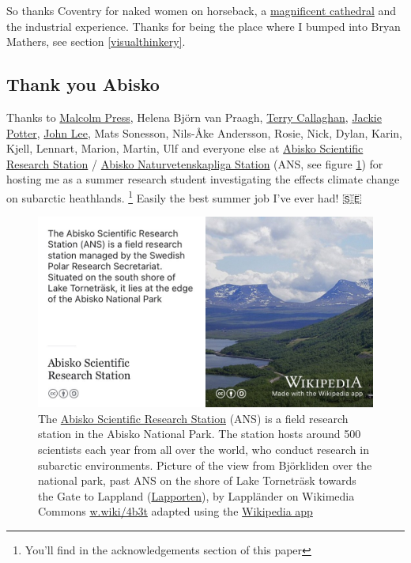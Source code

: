 \documentclass[
]{book}
\begin{document}
So thanks Coventry for naked women on horseback, a \href{https://en.wikipedia.org/wiki/Coventry_Cathedral}{magnificent cathedral} and the industrial experience. Thanks for being the place where I bumped into Bryan Mathers, see section \ref{visualthinkery}. 🙏

\hypertarget{abisko}{%
\subsection{Thank you Abisko}\label{abisko}}

Thanks to \href{https://en.wikipedia.org/wiki/Malcolm_Press}{Malcolm Press}, Helena Björn van Praagh, \href{https://en.wikipedia.org/wiki/Terry_Callaghan}{Terry Callaghan}, \href{https://www.brookes.ac.uk/ocsld/about-ocsld/staff-profiles/jackie-potter/}{Jackie Potter}, \href{https://www.sheffield.ac.uk/biosciences/people/academic-staff/john-lee}{John Lee}, Mats Sonesson, Nils-Åke Andersson, Rosie, Nick, Dylan, Karin, Kjell, Lennart, Marion, Martin, Ulf and everyone else at \href{https://en.wikipedia.org/wiki/Abisko_Scientific_Research_Station}{Abisko Scientific Research Station} / \href{https://sv.wikipedia.org/wiki/Abisko_naturvetenskapliga_station}{Abisko Naturvetenskapliga Station} (ANS, see figure \ref{fig:abisko-fig}) for hosting me as a summer research student investigating the effects climate change on subarctic heathlands. \citep{subarctic}\footnote{You'll find in the acknowledgements section of this paper} Easily the best summer job I've ever had! 🇸🇪

\begin{figure}

{\centering \includegraphics[width=0.99\linewidth]{images/abisko} 

}

\caption{The \href{https://en.wikipedia.org/wiki/Abisko_Scientific_Research_Station}{Abisko Scientific Research Station} (ANS) is a field research station in the Abisko National Park. The station hosts around 500 scientists each year from all over the world, who conduct research in subarctic environments. Picture of the view from Björkliden over the national park, past ANS on the shore of Lake Torneträsk towards the Gate to Lappland (\href{https://en.wikipedia.org/wiki/Lapporten}{Lapporten}), by Lappländer on Wikimedia Commons \href{https://w.wiki/4b3t}{w.wiki/4b3t} adapted using the \href{https://apps.apple.com/us/app/wikipedia/id324715238}{Wikipedia app}}\label{fig:abisko-fig}
\end{figure}
\end{document}

